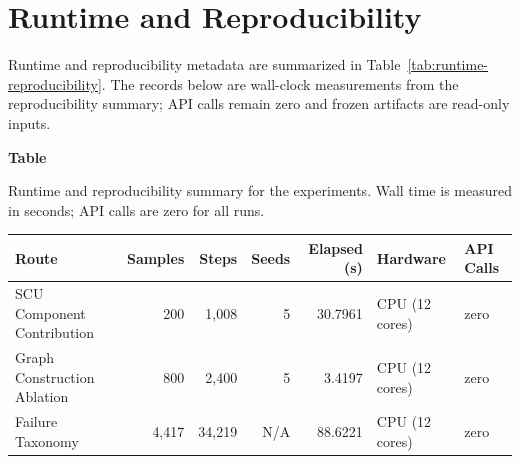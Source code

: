 \documentclass[a4paper,fleqn]{cas-sc}
\begin{document}
\section{Runtime and Reproducibility}
\label{app:runtime-reproducibility}

Runtime and reproducibility metadata are summarized in Table~\ref{tab:runtime-reproducibility}. The records below are wall-clock measurements from the reproducibility summary; API calls remain zero and frozen artifacts are read-only inputs.

\par\medskip
{}\label{tab:runtime-reproducibility}
\noindent\textbf{Table~\thetable}\par
\noindent Runtime and reproducibility summary for the experiments. Wall time is measured in seconds; API calls are zero for all runs.
\begin{center}
\small
\begin{tabular}{lrrrrl l}
\toprule
Route & Samples & Steps & Seeds & Elapsed (s) & Hardware & API Calls \\
\midrule
SCU Component Contribution & 200 & 1,008 & 5 & 30.7961 & CPU (12 cores) & zero \\
Graph Construction Ablation & 800 & 2,400 & 5 & 3.4197 & CPU (12 cores) & zero \\
Failure Taxonomy & 4,417 & 34,219 & N/A & 88.6221 & CPU (12 cores) & zero \\
\bottomrule
\end{tabular}
\end{center}
\medskip


\clearpage


\end{document}

